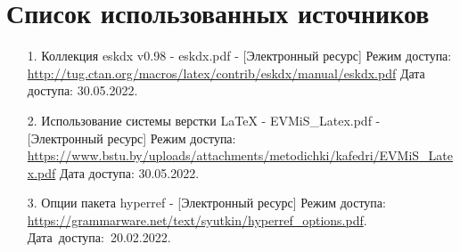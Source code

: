 \documentclass[12pt, a4paper, simple]{eskdtext}
\begin{document}
    \section*{Список использованных источников}
    \begin{enumerate}
        \item[1.] Коллекция eskdx v0.98 - eskdx.pdf
        - [Электронный ресурс]
        Режим доступа: \url{http://tug.ctan.org/macros/latex/contrib/eskdx/manual/eskdx.pdf}
        Дата доступа: 30.05.2022.
    
        \item[2.] Использование системы верстки LaTeX - EVMiS\_Latex.pdf
        - [Электронный ресурс]
        Режим доступа: \url{https://www.bstu.by/uploads/attachments/metodichki/kafedri/EVMiS_Latex.pdf}
        Дата доступа: 30.05.2022.
    
        \item[3.] Опции пакета hyperref
        - [Электронный ресурс]
        Режим доступа: \url{https://grammarware.net/text/syutkin/hyperref_options.pdf}.
        Дата~доступа:~20.02.2022.
    \end{enumerate}


    \newpage
\end{document}
